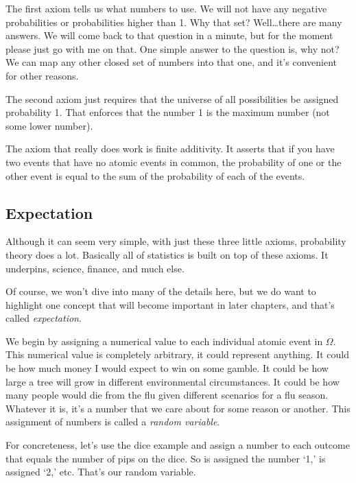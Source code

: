 The first axiom tells us what numbers to use.  We will not have any negative probabilities or probabilities higher than 1.  Why that set?  Well\dots there are many answers.  We will come back to that question in a minute, but for the moment please just go with me on that.  One simple answer to the question is, why not? We can map any other closed set of numbers into that one, and it's convenient for other reasons. 

The second axiom just requires that the universe of all possibilities be assigned probability 1.  That enforces that the number 1 is the maximum number (not some lower number).

The axiom that really does work is finite additivity.  It asserts that if you have two events that have no atomic events in common, the probability of one or the other event is equal to  the sum of the probability of each of the events.

\subsection{Expectation}

Although it can seem very simple, with just these three little axioms, probability theory does a lot.  Basically all of statistics is built on top of these axioms. It underpins, science, finance, and much else.

Of course, we won't dive into many of the details here, but we do want to highlight one concept that will become important in later chapters, and that's called {\it expectation}.  

We begin by assigning a numerical value to each individual atomic event in $\Omega$.  This numerical value is completely arbitrary, it could represent anything.  It could be how much money I would expect to win on some gamble. It could be how large a tree will grow in different environmental circumstances. It could be how many people would die from the flu given different scenarios for a flu season.  Whatever it is, it's a number that we care about for some reason or another.  This assignment of numbers is called a {\it random variable}.

For concreteness, let's use the dice example and assign a number to each outcome that equals the number of pips on the dice.  So  is assigned the number `1,'  is assigned `2,' etc.  That's our random variable.

